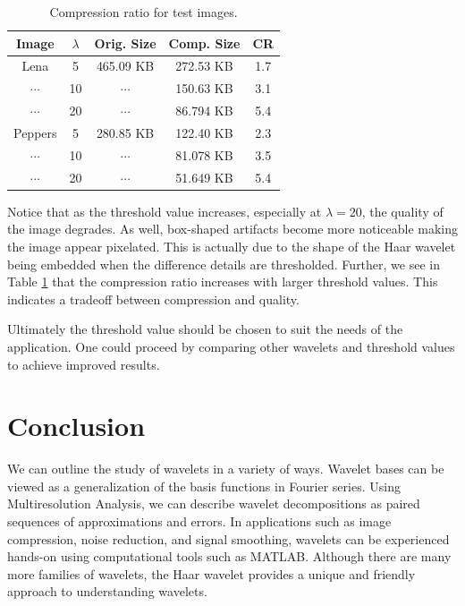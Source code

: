 \documentclass[12pt]{article}
\theoremstyle{definition}
\begin{document}
  \begin{table}[ht]
    \centering
    \begin{tabular}{c|c|c|c|c}
      Image & \(\lambda\) & Orig. Size & Comp. Size & CR\\
      \hline
      Lena & 5 & 465.09 KB & 272.53 KB & 1.7\\
      $\cdots$ & 10 & $\cdots$ & 150.63 KB & 3.1\\
      $\cdots$ & 20 & $\cdots$ & 86.794 KB & 5.4\\
      \hline
      Peppers & 5 & 280.85 KB & 122.40 KB & 2.3\\
      $\cdots$ & 10 & $\cdots$ & 81.078 KB & 3.5\\
      $\cdots$ & 20 & $\cdots$ & 51.649 KB & 5.4
    \end{tabular}
    \caption{Compression ratio for test images.}
    \label{tab:compression-ratio}
  \end{table}

  Notice that as the threshold value increases, especially at \(\lambda = 20\), the quality of the image degrades. As well, box-shaped artifacts become more noticeable making the image appear pixelated. This is actually due to the shape of the Haar wavelet being embedded when the difference details are thresholded. Further, we see in Table \ref{tab:compression-ratio} that the compression ratio increases with larger threshold values. This indicates a tradeoff between compression and quality.
  
  Ultimately the threshold value should be chosen to suit the needs of the application. One could proceed by comparing other wavelets and threshold values to achieve improved results.

  \section{Conclusion}
  We can outline the study of wavelets in a variety of ways. Wavelet bases can be viewed as a generalization of the basis functions in Fourier series. Using Multiresolution Analysis, we can describe wavelet decompositions as paired sequences of approximations and errors. In applications such as image compression, noise reduction, and signal smoothing, wavelets can be experienced hands-on using computational tools such as MATLAB. Although there are many more families of wavelets, the Haar wavelet provides a unique and friendly approach to understanding wavelets.

\end{document}
